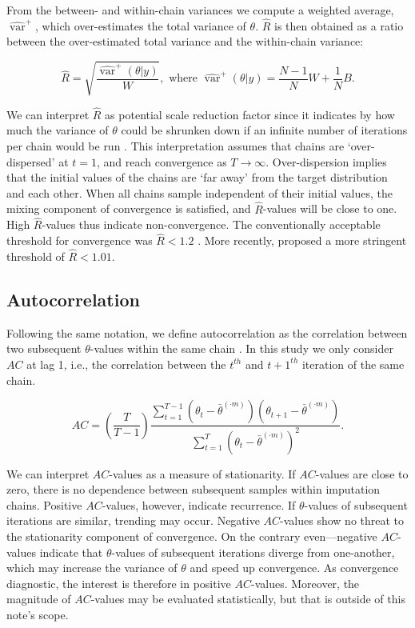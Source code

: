 \documentclass[Royal,times,sageh]{sagej}
\begin{document}
From the between- and within-chain variances we compute a weighted
average, \(\widehat{\operatorname{var}}^{+}\), which over-estimates the
total variance of \(\theta\). \(\widehat{R}\) is then obtained as a
ratio between the over-estimated total variance and the within-chain
variance:

\begin{equation*}
\widehat{R}=\sqrt{\frac{\widehat{\operatorname{var}}^{+}(\theta | y)}{W}},
\text{ where } \widehat{\operatorname{var}}^{+}(\theta | y)=\frac{N-1}{N} W+\frac{1}{N} B.
\end{equation*}

We can interpret \(\widehat{R}\) as potential scale reduction factor
since it indicates by how much the variance of \(\theta\) could be
shrunken down if an infinite number of iterations per chain would be run
\citep{gelm92}. This interpretation assumes that chains are
`over-dispersed' at \(t=1\), and reach convergence as \(T \to \infty\).
Over-dispersion implies that the initial values of the chains are `far
away' from the target distribution and each other. When all chains
sample independent of their initial values, the mixing component of
convergence is satisfied, and \(\widehat{R}\)-values will be close to
one. High \(\widehat{R}\)-values thus indicate non-convergence. The
conventionally acceptable threshold for convergence was
\(\widehat{R} < 1.2\) \citep{gelm92}. More recently, \citet{veht19}
proposed a more stringent threshold of \(\widehat{R} < 1.01\).

\hypertarget{autocorrelation}{%
\subsection{Autocorrelation}\label{autocorrelation}}

Following the same notation, we define autocorrelation as the
correlation between two subsequent \(\theta\)-values within the same
chain \citep[p.~147]{lync07}. In this study we only consider \(AC\) at
lag 1, i.e., the correlation between the \(t^{th}\) and \(t+1^{th}\)
iteration of the same chain.

\begin{equation*}
AC = \left( \frac{T}{T-1} \right) \frac{\sum_{t=1}^{T-1}(\theta_t - \bar{\theta}^{(\cdot m)})(\theta_{t+1} - \bar{\theta}^{(\cdot m)})}{\sum_{t=1}^{T}(\theta_t - \bar{\theta}^{(\cdot m)})^2}.
\end{equation*}

We can interpret \(AC\)-values as a measure of stationarity. If
\(AC\)-values are close to zero, there is no dependence between
subsequent samples within imputation chains. Positive \(AC\)-values,
however, indicate recurrence. If \(\theta\)-values of subsequent
iterations are similar, trending may occur. Negative \(AC\)-values show
no threat to the stationarity component of convergence. On the contrary
even---negative \(AC\)-values indicate that \(\theta\)-values of
subsequent iterations diverge from one-another, which may increase the
variance of \(\theta\) and speed up convergence. As convergence
diagnostic, the interest is therefore in positive \(AC\)-values.
Moreover, the magnitude of \(AC\)-values may be evaluated statistically,
but that is outside of this note's scope.
\end{document}
